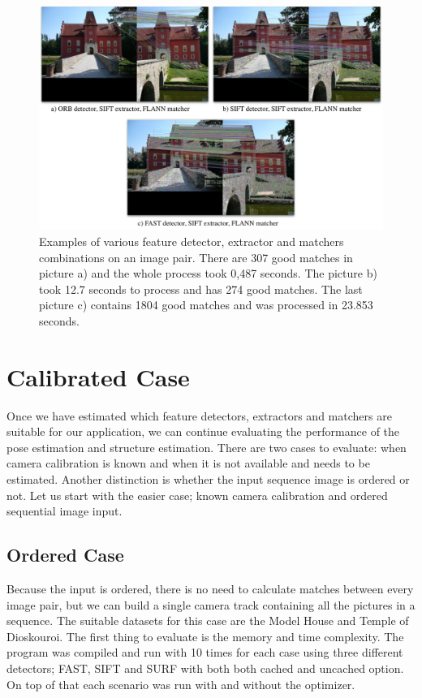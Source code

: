 \begin{figure}[!htbp]
	\begin{center}
		\includegraphics[keepaspectratio,width=\textwidth]{fig/matches.pdf}
	\end{center}
	\caption{Examples of various feature detector, extractor and matchers combinations on an image pair. There are 307 good matches in picture a) and the whole process took 0,487 seconds. The picture b) took 12.7 seconds to process and has 274 good matches. The last picture c) contains 1804 good matches and was processed in 23.853 seconds.}
	\label{fig:matches}
\end{figure}


\section{Calibrated Case}
\label{sec:experiments-calibrated}
Once we have estimated which feature detectors, extractors and matchers are suitable for our application, we can continue evaluating the performance of the pose estimation and structure estimation. There are two cases to evaluate: when camera calibration is known and when it is not available and needs to be estimated.  Another distinction is whether the input sequence image is ordered or not. Let us start with the easier case; known camera calibration and ordered sequential image input.

\subsection*{Ordered Case}
\label{sub:ordered_case}
Because the input is ordered, there is no need to calculate matches between every image pair, but we can build a single camera track containing all the pictures in a sequence. The suitable datasets for this case are the Model House and Temple of Dioskouroi. The first thing to evaluate is the memory and time complexity. The program was compiled and run with 10 times for each case using three different detectors; FAST, SIFT and SURF with both both cached and uncached option. On top of that each scenario was run with and without the optimizer. 

